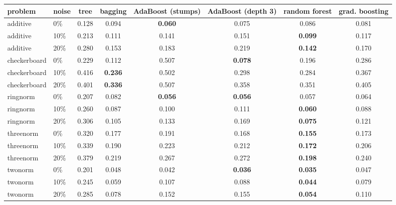 \begin{tabular}{llcccccc}
\toprule
problem & noise & tree & bagging & AdaBoost (stumps) & AdaBoost (depth 3) & random forest & grad. boosting \\
\midrule
additive & 0\% & 0.128 & 0.094 & \textbf{0.060} & 0.075 & 0.086 & 0.081 \\
additive & 10\% & 0.213 & 0.111 & 0.141 & 0.151 & \textbf{0.099} & 0.117 \\
additive & 20\% & 0.280 & 0.153 & 0.183 & 0.219 & \textbf{0.142} & 0.170 \\
checkerboard & 0\% & 0.229 & 0.112 & 0.507 & \textbf{0.078} & 0.196 & 0.286 \\
checkerboard & 10\% & 0.416 & \textbf{0.236} & 0.502 & 0.298 & 0.284 & 0.367 \\
checkerboard & 20\% & 0.401 & \textbf{0.336} & 0.507 & 0.358 & 0.351 & 0.405 \\
ringnorm & 0\% & 0.207 & 0.082 & \textbf{0.056} & \textbf{0.056} & 0.057 & 0.064 \\
ringnorm & 10\% & 0.260 & 0.087 & 0.100 & 0.111 & \textbf{0.060} & 0.088 \\
ringnorm & 20\% & 0.306 & 0.105 & 0.133 & 0.169 & \textbf{0.075} & 0.121 \\
threenorm & 0\% & 0.320 & 0.177 & 0.191 & 0.168 & \textbf{0.155} & 0.173 \\
threenorm & 10\% & 0.339 & 0.190 & 0.223 & 0.212 & \textbf{0.172} & 0.206 \\
threenorm & 20\% & 0.379 & 0.219 & 0.267 & 0.272 & \textbf{0.198} & 0.240 \\
twonorm & 0\% & 0.201 & 0.048 & 0.042 & \textbf{0.036} & \textbf{0.035} & 0.047 \\
twonorm & 10\% & 0.245 & 0.059 & 0.107 & 0.088 & \textbf{0.044} & 0.079 \\
twonorm & 20\% & 0.285 & 0.078 & 0.152 & 0.155 & \textbf{0.054} & 0.110 \\
\bottomrule
\end{tabular}
